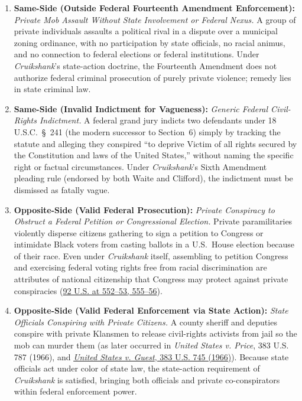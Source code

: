 \documentclass[12pt]{article}
\begin{document}
\begin{enumerate}
    \item \textbf{Same-Side (Outside Federal Fourteenth Amendment Enforcement):} \textit{Private Mob Assault Without State Involvement or Federal Nexus.} A group of private individuals assaults a political rival in a dispute over a municipal zoning ordinance, with no participation by state officials, no racial animus, and no connection to federal elections or federal institutions. Under \textit{Cruikshank}'s state-action doctrine, the Fourteenth Amendment does not authorize federal criminal prosecution of purely private violence; remedy lies in state criminal law.
    \item \textbf{Same-Side (Invalid Indictment for Vagueness):} \textit{Generic Federal Civil-Rights Indictment.} A federal grand jury indicts two defendants under 18 U.S.C.~\S~241 (the modern successor to Section~6) simply by tracking the statute and alleging they conspired ``to deprive Victim of all rights secured by the Constitution and laws of the United States,'' without naming the specific right or factual circumstances. Under \textit{Cruikshank}'s Sixth Amendment pleading rule (endorsed by both Waite and Clifford), the indictment must be dismissed as fatally vague.
    \item \textbf{Opposite-Side (Valid Federal Prosecution):} \textit{Private Conspiracy to Obstruct a Federal Petition or Congressional Election.} Private paramilitaries violently disperse citizens gathering to sign a petition to Congress or intimidate Black voters from casting ballots in a U.S.~House election because of their race. Even under \textit{Cruikshank} itself, assembling to petition Congress and exercising federal voting rights free from racial discrimination are attributes of national citizenship that Congress may protect against private conspiracies (\href{https://supreme.justia.com/cases/federal/us/92/542/}{92 U.S. at 552--53, 555--56}).
    \item \textbf{Opposite-Side (Valid Federal Enforcement via State Action):} \textit{State Officials Conspiring with Private Citizens.} A county sheriff and deputies conspire with private Klansmen to release civil-rights activists from jail so the mob can murder them (as later occurred in \textit{United States v. Price}, 383 U.S. 787 (1966), and \href{https://www.law.cornell.edu/supremecourt/text/383/745}{\textit{United States v. Guest}, 383 U.S. 745 (1966)}). Because state officials act under color of state law, the state-action requirement of \textit{Cruikshank} is satisfied, bringing both officials and private co-conspirators within federal enforcement power.

\end{enumerate}
\end{document}
